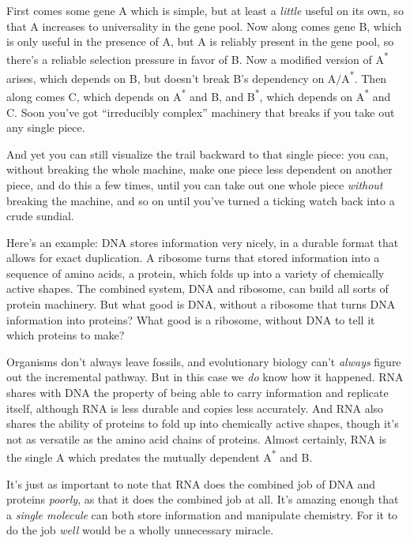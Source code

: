 {
 First comes some gene A which is simple, but at least a
\textit{little} useful on its own, so that A increases to universality
in the gene pool. Now along comes gene B, which is only useful in the
presence of A, but A is reliably present in the gene pool, so
there's a reliable selection pressure in favor of B.
Now a modified version of A\textsuperscript{*} arises, which depends on
B, but doesn't break B's dependency on
A$/$A\textsuperscript{*}. Then along comes C, which depends on
A\textsuperscript{*} and B, and B\textsuperscript{*}, which depends on
A\textsuperscript{*} and C. Soon you've got
``irreducibly complex'' machinery
that breaks if you take out any single piece.}

{
 And yet you can still visualize the trail backward to that single
piece: you can, without breaking the whole machine, make one piece less
dependent on another piece, and do this a few times, until you can take
out one whole piece \textit{without} breaking the machine, and so on
until you've turned a ticking watch back into a crude
sundial.}

{
 Here's an example: DNA stores information very
nicely, in a durable format that allows for exact duplication. A
ribosome turns that stored information into a sequence of amino acids,
a protein, which folds up into a variety of chemically active shapes.
The combined system, DNA and ribosome, can build all sorts of protein
machinery. But what good is DNA, without a ribosome that turns DNA
information into proteins? What good is a ribosome, without DNA to tell
it which proteins to make?}

{
 Organisms don't always leave fossils, and
evolutionary biology can't \textit{always} figure out
the incremental pathway. But in this case we \textit{do} know how it
happened. RNA shares with DNA the property of being able to carry
information and replicate itself, although RNA is less durable and
copies less accurately. And RNA also shares the ability of proteins to
fold up into chemically active shapes, though it's not
as versatile as the amino acid chains of proteins. Almost certainly,
RNA is the single A which predates the mutually dependent
A\textsuperscript{*} and B.}

{
 It's just as important to note that RNA does the
combined job of DNA and proteins \textit{poorly}, as that it does the
combined job at all. It's amazing enough that a
\textit{single molecule} can both store information and manipulate
chemistry. For it to do the job \textit{well} would be a wholly
unnecessary miracle.}

